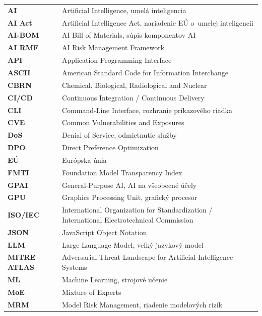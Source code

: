 \begin{longtable}{@{}>{\bfseries}p{3.9cm}@{}>{\raggedright\arraybackslash}p{\dimexpr\textwidth-3.9cm\relax}@{}}
    AI          & Artificial Intelligence, umelá inteligencia \\
    AI Act      & Artificial Intelligence Act, nariadenie EÚ o~umelej inteligencii \\
    AI-BOM      & AI Bill of Materials, súpis komponentov AI \\
    AI RMF      & AI Risk Management Framework \\
    API         & Application Programming Interface \\
    ASCII       & American Standard Code for Information Interchange \\
    CBRN        & Chemical, Biological, Radiological and Nuclear \\
    CI/CD       & Continuous Integration / Continuous Delivery \\
    CLI         & Command-Line Interface, rozhranie príkazového riadka \\
    CVE         & Common Vulnerabilities and Exposures \\
    DoS         & Denial of Service, odmietnutie služby \\
    DPO         & Direct Preference Optimization \\
    EÚ          & Európska únia \\
    FMTI        & Foundation Model Transparency Index \\
    GPAI        & General-Purpose AI, AI na všeobecné účely \\
    GPU         & Graphics Processing Unit, grafický procesor \\
    ISO/IEC     & International Organization for Standardization / International Electrotechnical Commission \\
    JSON        & JavaScript Object Notation \\
    LLM         & Large Language Model, veľký jazykový model \\
    MITRE ATLAS & Adversarial Threat Landscape for Artificial-Intelligence Systems \\
    ML          & Machine Learning, strojové učenie \\
    MoE         & Mixture of Experts \\
    MRM         & Model Risk Management, riadenie modelových rizík \\

\end{longtable}
